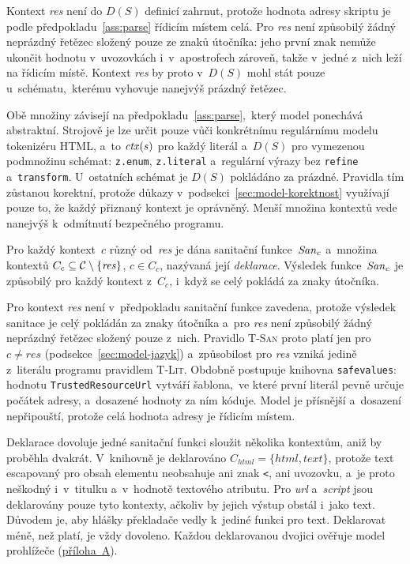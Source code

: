 Kontext \emph{res} není do $D(S)$ definicí zahrnut, protože hodnota adresy skriptu je podle předpokladu~\ref{ass:parse} řídicím místem celá. Pro \emph{res} není způsobilý žádný neprázdný řetězec složený pouze ze znaků útočníka: jeho první znak nemůže ukončit hodnotu v~uvozovkách i~v~apostrofech zároveň, takže v~jedné z~nich leží na řídicím místě. Kontext \emph{res} by proto v~$D(S)$ mohl stát pouze u~schématu,~kterému vyhovuje nanejvýš prázdný řetězec.

Obě množiny závisejí na předpokladu~\ref{ass:parse},~který model ponechává abstraktní. Strojově je lze určit pouze vůči konkrétnímu regulárnímu modelu tokenizéru HTML, a~to $\mathit{ctx}(s)$ pro každý literál a~$D(S)$ pro vymezenou podmnožinu schémat: \texttt{z.enum}, \texttt{z.literal} a~regulární výrazy bez \texttt{refine} a~\texttt{transform}. U~ostatních schémat je $D(S)$ pokládáno za prázdné. Pravidla tím zůstanou korektní, protože důkazy v~podsekci~\ref{sec:model-korektnost} využívají pouze to, že každý přiznaný kontext je oprávněný. Menší množina kontextů vede nanejvýš k~odmítnutí bezpečného programu.

\begin{predpoklad}
\label{ass:san}
Pro každý kontext~$c$ různý od~\emph{res} je dána sanitační funkce~$\mathit{San}_c$ a~množina kontextů $C_c \subseteq \mathcal{C} \setminus \{\mathit{res}\}$, $c \in C_c$, nazývaná její \emph{deklarace}. Výsledek funkce~$\mathit{San}_c$ je způsobilý pro každý kontext z~$C_c$, i~když se celý pokládá za znaky útočníka.
\end{predpoklad}

Pro kontext \emph{res} není v~předpokladu sanitační funkce zavedena, protože výsledek sanitace je celý pokládán za znaky útočníka a~pro \emph{res} není způsobilý žádný neprázdný řetězec složený pouze z~nich. Pravidlo \textsc{T-San} proto platí jen pro $c \neq \mathit{res}$ (podsekce~\ref{sec:model-jazyk}) a~způsobilost pro \emph{res} vzniká jedině z~literálu programu pravidlem \mbox{\textsc{T-Lit}}. Obdobně postupuje knihovna \texttt{safevalues}: hodnotu \texttt{TrustedResourceUrl} vytváří šablona,~ve které první literál pevně určuje počátek adresy, a~dosazené hodnoty za ním kóduje. Model je přísnější a~dosazení nepřipouští, protože celá hodnota adresy je řídicím místem.

Deklarace dovoluje jedné sanitační funkci sloužit několika kontextům, aniž by proběhla dvakrát. V~knihovně je deklarováno $C_{\mathit{html}} = \{\mathit{html}, \mathit{text}\}$, protože text escapovaný pro obsah elementu neobsahuje ani znak \texttt{<}, ani uvozovku, a~je proto neškodný i~v~titulku a~v~hodnotě textového atributu. Pro \emph{url} a~\emph{script} jsou deklarovány pouze tyto kontexty, ačkoliv by jejich výstup obstál i~jako text. Důvodem je, aby hlášky překladače vedly k~jediné funkci pro text. Deklarovat méně, než platí, je vždy dovoleno. Každou deklarovanou dvojici ověřuje model prohlížeče (\hyperref[app:own-work]{příloha~A}).

